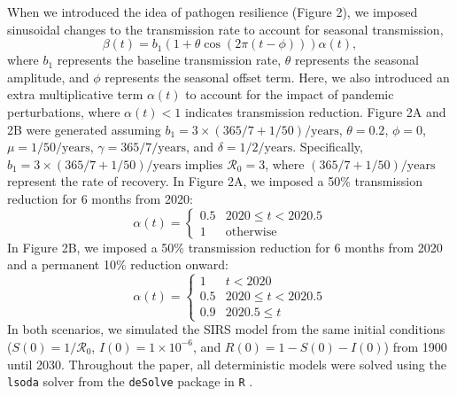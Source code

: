 \documentclass[12pt]{article}
\begin{document}
When we introduced the idea of pathogen resilience (Figure 2), we imposed sinusoidal changes to the transmission rate to account for seasonal transmission,
\begin{equation}
\beta(t) = b_1 (1 + \theta \cos(2 \pi (t-\phi))) \alpha(t),
\end{equation}
where $b_1$ represents the baseline transmission rate, $\theta$ represents the seasonal amplitude, and $\phi$ represents the seasonal offset term.
Here, we also introduced an extra multiplicative term $\alpha(t)$ to account for the impact of pandemic perturbations, where $\alpha(t) < 1$ indicates transmission reduction.
Figure 2A and 2B were generated assuming $b_1 = 3 \times (365/7+1/50)/\mathrm{years}$, $\theta=0.2$, $\phi=0$, $\mu=1/50/\mathrm{years}$, $\gamma=365/7/\mathrm{years}$, and $\delta=1/2/\mathrm{years}$.
Specifically, $b_1 = 3 \times (365/7+1/50)/\mathrm{years}$ implies $\mathcal R_0 = 3$, where $(365/7+1/50)/\mathrm{years}$ represent the rate of recovery.
In Figure 2A, we imposed a 50\% transmission reduction for 6 months from 2020:
\begin{equation}
\alpha(t) = \begin{cases}
0.5 & 2020 \leq t< 2020.5\\
1 & \textrm{otherwise}
\end{cases}
\end{equation}
In Figure 2B, we imposed a 50\% transmission reduction for 6 months from 2020 and a permanent 10\% reduction onward:
\begin{equation}
\alpha(t) = \begin{cases}
1 & t < 2020\\
0.5 & 2020 \leq t < 2020.5\\
0.9 & 2020.5 \leq t
\end{cases}
\end{equation}
In both scenarios, we simulated the SIRS model from the same initial conditions ($S(0) = 1/\mathcal R_0$, $I(0) = 1\times 10^{-6}$, and $R(0) = 1 - S(0) - I(0)$) from 1900 until 2030.
Throughout the paper, all deterministic models were solved using the \texttt{lsoda} solver from the \texttt{deSolve} package \citep{soetaert2010solving} in \texttt{R} \citep{citeR}.
\end{document}
